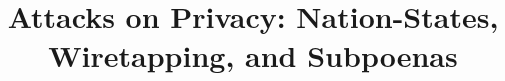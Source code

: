 \documentclass[letterpaper,twocolumn,10pt]{article}
\begin{document}
\date{}

\title{\Large \bf Attacks on Privacy: Nation-States, Wiretapping, and Subpoenas}


\maketitle

\thispagestyle{empty}






%





%





{\footnotesize 
}
\end{document}
